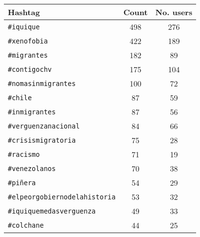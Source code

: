 %
    
    \begin{tabular}{lcc}
        \toprule\toprule
        Hashtag & Count & No. users\\ \midrule
        \texttt{\#iquique} & 498 & 276 \\ 
        \texttt{\#xenofobia} & 422 & 189 \\ 
        \texttt{\#migrantes} &  182 & 89 \\ 
        \texttt{\#contigochv} &  175 & 104 \\
        \texttt{\#nomasinmigrantes} & 100 & 72 \\ 
        \texttt{\#chile} & 87 & 59 \\ 
        \texttt{\#inmigrantes} & 87 & 56 \\ 
        \texttt{\#verguenzanacional} & 84 & 66 \\
        \texttt{\#crisismigratoria} & 75 & 28 \\ 
        \texttt{\#racismo} & 71 & 19 \\
        \texttt{\#venezolanos} & 70 & 38 \\ 
        \texttt{\#piñera} & 54 & 29 \\ 
        \texttt{\#elpeorgobiernodelahistoria} & 53 & 32 \\
        \texttt{\#iquiquemedasverguenza} & 49 & 33 \\
        \texttt{\#colchane} & 44 & 25 \\
        \bottomrule\bottomrule
    \end{tabular}

%